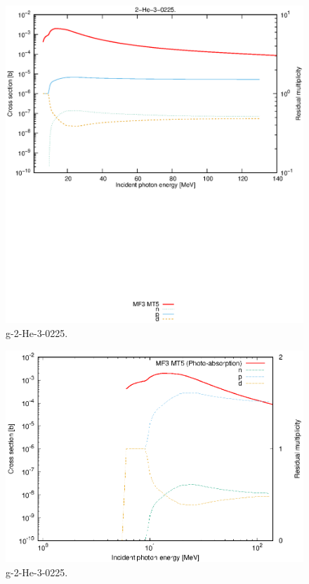 \begin{figure}
 \includegraphics[width=\linewidth]{eps/g_2-He-3_0225.eps}
  \caption{g-2-He-3-0225.}
\end{figure}
\newpage \clearpage

\begin{figure}
 \includegraphics[width=\linewidth]{eps-log/g_2-He-3_0225.eps}
 \caption{g-2-He-3-0225.}
\end{figure}
\newpage \clearpage

